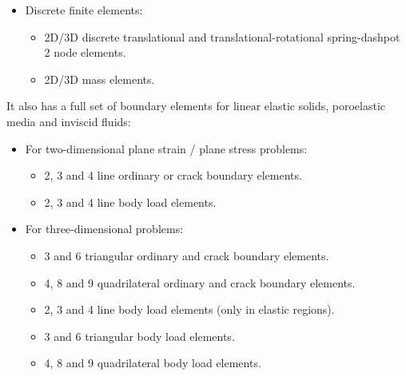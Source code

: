 \documentclass[a4paper,fleqn]{book}
\begin{document}
\begin{itemize}
\begin{itemize}
\begin{itemize}
            \item 4, 8 and 6 nodes quadrilateral shell element based on the degeneration from solid (full/selective/reduced integration) \cite{onate2013}.
            \item 3 and 6 nodes triangular MITC element (locking-free): MITC3i \cite{lee2004,lee2014}, MITC6a \cite{lee2004}.
            \item 4, 8 and 9 nodes quadrilateral MITC element (locking-free): MITC4 \cite{dvorkin1984}, MITC8 \cite{Bathe1986,jung2013}, MITC9 \cite{Bucalem1993,bathe2003}.
        \end{itemize}
    \end{itemize}
    \item Discrete finite elements:
    \begin{itemize}
        \item 2D/3D discrete translational and translational-rotational spring-dashpot 2 node elements.
        \item 2D/3D mass elements.
    \end{itemize}
\end{itemize}

It also has a full set of boundary elements for linear elastic solids, poroelastic media and inviscid fluids:
\begin{itemize}
    \item For two-dimensional plane strain / plane stress problems:
    \begin{itemize}
        \item 2, 3 and 4 line ordinary or crack boundary elements.
        \item 2, 3 and 4 line body load elements.
    \end{itemize}
    \item For three-dimensional problems:
    \begin{itemize}
        \item 3 and 6 triangular ordinary and crack boundary elements.
        \item 4, 8 and 9 quadrilateral ordinary and crack boundary elements.
        \item 2, 3 and 4 line body load elements (only in elastic regions).
        \item 3 and 6 triangular body load elements.
        \item 4, 8 and 9 quadrilateral body load elements.        
    \end{itemize}
\end{itemize}
\end{document}
